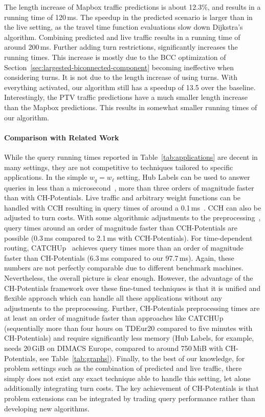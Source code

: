 \documentclass[manuscript,review]{acmart}
\begin{document}
The length increase of Mapbox traffic predictions is about 12.3\%, and results in a running time of 120\,ms.
The speedup in the predicted scenario is larger than in the live setting, as the travel time function evaluations slow down Dijkstra's algorithm.
Combining predicted and live traffic results in a running time of around 200\,ms.
Further adding turn restrictions, significantly increases the running times.
This increase is mostly due to the BCC optimization of Section~\ref{sec:largested-biconnected-component} becoming ineffective when considering turns.
It is not due to the length increase of using turns.
With everything activated, our algorithm still has a speedup of 13.5 over the baseline.
Interestingly, the PTV traffic predictions have a much smaller length increase than the Mapbox predictions.
This results in somewhat smaller running times of our algorithm.

\paragraph{Comparison with Related Work}

While the query running times reported in Table~\ref{tab:applications} are decent in many settings, they are not competitive to techniques tailored to specific applications.
In the simple $w_q = w_{\ell}$ setting, Hub Labels can be used to answer queries in less than a microsecond~\cite{DBLP:conf/wea/DellingGW13}, more than three orders of magnitude faster than with CH-Potentials.
Live traffic and arbitrary weight functions can be handled with CCH resulting in query times of around a 0.1\,ms~\cite{DBLP:journals/jea/Buchhold0W19}.
CCH can also be adjusted to turn costs.
With some algorithmic adjustments to the preprocessing~\cite{bwzz-cchtc-20}, query times around an order of magnitude faster than CCH-Potentials are possible (0.3\,ms compared to 2.1\,ms with CCH-Potentials).
For time-dependent routing, CATCHUp~\cite{swz-sfert-21} achieves query times more than an order of magnitude faster than CH-Potentials (6.3\,ms compared to our 97.7\,ms).
Again, these numbers are not perfectly comparable due to different benchmark machines.
Nevertheless, the overall picture is clear enough.
However, the advantage of the CH-Potentials framework over these fine-tuned techniques is that it is unified and flexible approach which can handle all these applications without any adjustments to the preprocessing.
Further, CH-Potentials preprocessing times are at least an order of magnitude faster than approaches like CATCHUp (sequentially more than four hours on TDEur20 compared to five minutes with CH-Potentials) and require significantly less memory (Hub Labels, for example, needs 20\,GiB on DIMACS Europe, compared to around 750\,MiB with CH-Potentials, see Table~\ref{tab:graphs}).
Finally, to the best of our knowledge, for problem settings such as the combination of predicted and live traffic, there simply does not exist any exact technique able to handle this setting, let alone additionally integrating turn costs.
The key achievement of CH-Potentials is that problem extensions can be integrated by trading query performance rather than developing new algorithms.
\end{document}
